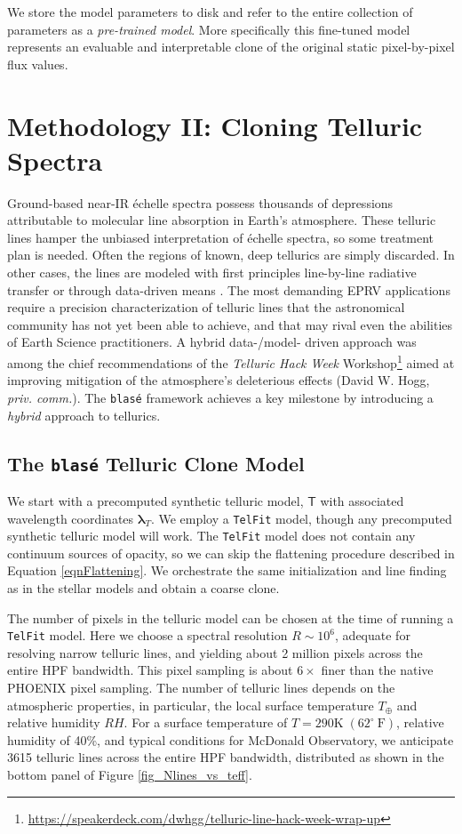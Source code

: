 \documentclass[twocolumn]{aastex631}
\begin{document}
We store the model parameters to disk and refer to the entire collection of parameters as a \emph{pre-trained model}.  More specifically this fine-tuned model represents an evaluable and interpretable clone of the original static pixel-by-pixel flux values.

\section{Methodology II: Cloning Telluric Spectra} \label{sectionTelluric}
Ground-based near-IR \'echelle spectra possess thousands of depressions attributable to molecular line absorption in Earth's atmosphere.  These telluric lines hamper the unbiased interpretation of \'echelle spectra, so some treatment plan is needed.  Often the regions of known, deep tellurics are simply discarded.  In other cases, the lines are modeled with first principles line-by-line radiative transfer \citep[\emph{e.g.} \texttt{TelFit,}][]{2014AJ....148...53G} or through data-driven means \citep[\emph{e.g.} \texttt{wobble,}][]{2019AJ....158..164B}.  The most demanding EPRV applications require a precision characterization of telluric lines that the astronomical community has not yet been able to achieve, and that may rival even the abilities of Earth Science practitioners.  A hybrid data-/model- driven approach was among the chief recommendations of the \emph{Telluric Hack Week} Workshop\footnote{\url{https://speakerdeck.com/dwhgg/telluric-line-hack-week-wrap-up}} aimed at improving mitigation of the atmosphere's deleterious effects (David W. Hogg, \emph{priv. comm.}).  The \texttt{blas\'e} framework achieves a key milestone by introducing a \emph{hybrid} approach to tellurics.

\subsection{The \texttt{blas\'e} Telluric Clone Model}
We start with a precomputed synthetic telluric model, $\mathsf{T}$ with associated wavelength coordinates $\bm{\lambda}_T$.  We employ a \texttt{TelFit} model, though any precomputed synthetic telluric model will work.  The \texttt{TelFit} model does not contain any continuum sources of opacity, so we can skip the flattening procedure described in Equation \ref{eqnFlattening}.  We orchestrate the same initialization and line finding as in the stellar models and obtain a coarse clone.

The number of pixels in the telluric model can be chosen at the time of running a \texttt{TelFit} model.  Here we choose a spectral resolution $R\sim10^6$, adequate for resolving narrow telluric lines, and yielding about 2 million pixels across the entire HPF bandwidth.  This pixel sampling is about $6\times$ finer than the native PHOENIX pixel sampling.  The number of telluric lines depends on the atmospheric properties, in particular, the local surface temperature $T_\oplus$ and relative humidity $RH$.  For a surface temperature of $T=290 \mathrm{K}\; (62^\circ~\mathrm{F})$, relative humidity of 40\%, and typical conditions for McDonald Observatory, we anticipate 3615 telluric lines across the entire HPF bandwidth, distributed as shown in the bottom panel of Figure \ref{fig_Nlines_vs_teff}.
\end{document}
